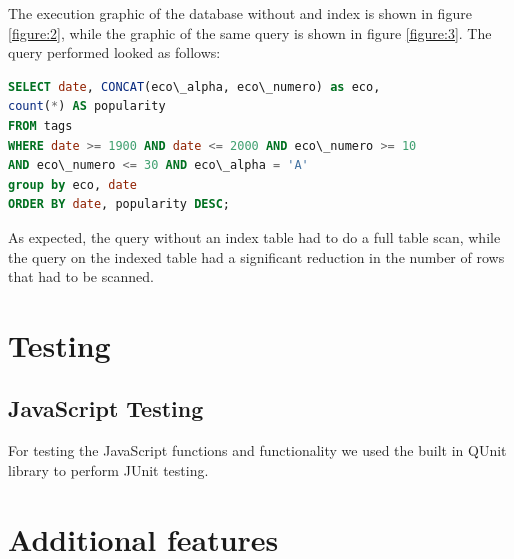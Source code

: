 \documentclass{article}
\begin{document}
The execution graphic of the database without and index is shown in figure
\ref{figure:2}, while the graphic of the same query is shown in figure
\ref{figure:3}. The query performed looked as follows:

\begin{lstlisting}[language=sql, frame=single]
SELECT date, CONCAT(eco\_alpha, eco\_numero) as eco,
count(*) AS popularity
FROM tags
WHERE date >= 1900 AND date <= 2000 AND eco\_numero >= 10
AND eco\_numero <= 30 AND eco\_alpha = 'A'
group by eco, date
ORDER BY date, popularity DESC;
\end{lstlisting}

As expected, the query without an index table had to do a full table scan,
while the query on the indexed table had a significant reduction in the
number of rows that had to be scanned.

\section{Testing}
\subsection{JavaScript Testing}
For testing the JavaScript functions and functionality we used the built in QUnit library to perform JUnit testing.

\section{Additional features}
\end{document}
